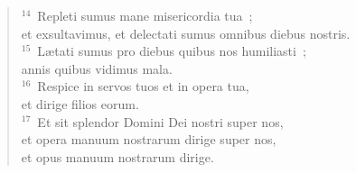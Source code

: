 \begin{verse}
${}^{14}$~Repleti sumus mane misericordia tua~;\\ et exsultavimus, et delectati sumus omnibus diebus nostris.\\
${}^{15}$~L\ae tati sumus pro diebus quibus nos humiliasti~;\\ annis quibus vidimus mala.\\
${}^{16}$~Respice in servos tuos et in opera tua,\\ et dirige filios eorum.\\
${}^{17}$~Et sit splendor Domini Dei nostri super nos,\\ et opera manuum nostrarum dirige super nos,\\ et opus manuum nostrarum dirige.\end{verse}



